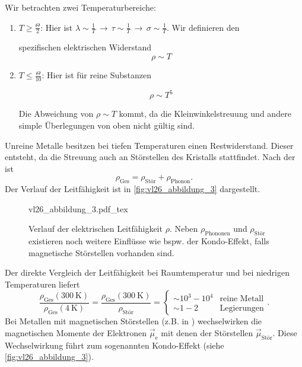 	Wir betrachten zwei Temperaturbereiche:
	\begin{enumerate}[label = \alph*)]
		\item $T\ge \frac{\Theta}{2}$: Hier ist $\lambda \sim \frac{1}{T}\, \to  \, \tau \sim \frac{1}{T} \, \to  \, \sigma \sim \frac{1}{T}$. Wir definieren den
			\begin{important}
				spezifischen elektrischen Widerstand
				\begin{equation}
					\label{eq:II.7.28}
					\rho \sim  T
				\end{equation}
			\end{important}
		\item $T\le \frac{\Theta}{10}$: Hier ist für reine Substanzen
			\begin{important}
				$$
				\rho \sim T^{5}
				$$ 
			\end{important}
			Die Abweichung von $\rho\sim T$ kommt, da die Kleinwinkelstreuung und andere simple Überlegungen von oben nicht gültig sind.
	\end{enumerate}

	Unreine Metalle besitzen bei tiefen Temperaturen einen Restwiderstand. Dieser entsteht, da die Streuung auch an Störstellen des Kristalls stattfindet.
	Nach der  ist
	\begin{equation}
		\label{eq:II.7.29}
		\rho_{\text{Ges}} = \rho_{\text{Stör}} + \rho_{\text{Phonon}}.
	\end{equation}
	Der Verlauf der Leitfähigkeit ist in \autoref{fig:vl26_abbildung_3} dargestellt.
	\begin{figure}[H]
		\centering
		\def\svgwidth{.328\columnwidth}
		{vl26_abbildung_3.pdf_tex}
		\caption{Verlauf der elektrischen Leitfähigkeit $\rho$. Neben $\rho_\mathrm{Phononen}$ und $\rho_\text{St\"or}$ existieren noch weitere Einflüsse wie bspw. der Kondo-Effekt, falls magnetische Störstellen vorhanden sind.}
		\label{fig:vl26_abbildung_3}
	\end{figure}
	Der direkte Vergleich der Leitfähigkeit bei Raumtemperatur und bei niedrigen Temperaturen liefert
	$$
	\frac{\rho_{\text{Ges}}(\SI{300}{\kelvin})}{\rho_{\text{Ges}}(\SI{4}{\kelvin})} = \frac{\rho_{\text{Ges}}(\SI{300}{\kelvin})}{\rho_{\text{Stör}}}
	= \begin{cases}
		\sim 10^{3} - 10^{4}& \text{reine Metall}\\
		\sim 1-2 & \text{Legierungen}
	\end{cases}.
	$$
	Bei Metallen mit magnetischen Störstellen (z.B.  in ) wechselwirken die magnetischen Momente der Elektronen $\Vec{\mu}_{\mathrm{e}}$ mit denen der Störstellen $\Vec{\mu}_{\text{Stör}}$.
	Diese Wechselwirkung führt zum sogenannten Kondo-Effekt (siehe \autoref{fig:vl26_abbildung_3}).
